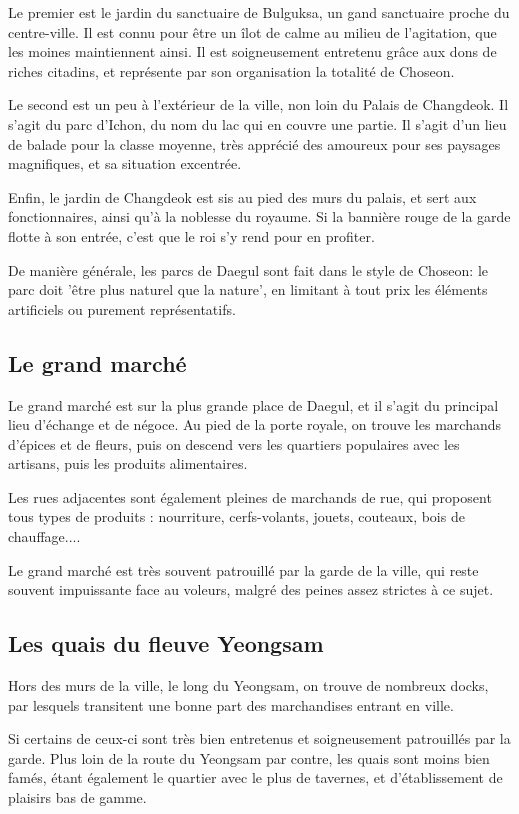 \documentclass[10pt,a4paper]{book}
\newcommand{\nomroyaume}{Choseon}
\begin{document}
Le premier est le jardin du sanctuaire de Bulguksa, un gand sanctuaire proche du centre-ville. Il est connu pour être un îlot de calme au milieu de l'agitation, que les moines maintiennent ainsi. Il est soigneusement entretenu grâce aux dons de riches citadins, et représente par son organisation la totalité de \nomroyaume.

Le second est un peu à l'extérieur de la ville, non loin du Palais de Changdeok. Il s'agit du parc d'Ichon, du nom du lac qui en couvre une partie. Il s'agit d'un lieu de balade pour la classe moyenne, très apprécié des amoureux pour ses paysages magnifiques, et sa situation excentrée.

Enfin, le jardin de Changdeok est sis au pied des murs du palais, et sert aux fonctionnaires, ainsi qu'à la noblesse du royaume. Si la bannière rouge de la garde flotte à son entrée, c'est que le roi s'y rend pour en profiter.

De manière générale, les parcs de Daegul sont fait dans le style de \nomroyaume : le parc doit 'être plus naturel que la nature', en limitant à tout prix les éléments artificiels ou purement représentatifs.
\subsection{Le grand marché}
Le grand marché est sur la plus grande place de Daegul, et il s'agit du principal lieu d'échange et de négoce. Au pied de la porte royale, on trouve les marchands d'épices et de fleurs, puis on descend vers les quartiers populaires avec les artisans, puis les produits alimentaires.

Les rues adjacentes sont également pleines de marchands de rue, qui proposent tous types de produits : nourriture, cerfs-volants, jouets, couteaux, bois de chauffage....

Le grand marché est très souvent patrouillé par la garde de la ville, qui reste souvent impuissante face au voleurs, malgré des peines assez strictes à ce sujet.
\subsection{Les quais du fleuve Yeongsam}
Hors des murs de la ville, le long du Yeongsam, on trouve de nombreux docks, par lesquels transitent une bonne part des marchandises entrant en ville. 

Si certains de ceux-ci sont très bien entretenus et soigneusement patrouillés par la garde. Plus loin de la route du Yeongsam par contre, les quais sont moins bien famés, étant également le quartier avec le plus de tavernes, et d'établissement de plaisirs bas de gamme. 
\end{document}
